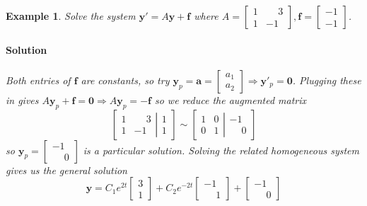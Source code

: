 \documentclass[letterpaper, 11pt, openany]{book}
\theoremstyle{mytheoremstyle}
\theoremstyle{myexamplestyle}
\newtheorem{example}{Example}[section]
\newenvironment{solution}{\paragraph{\sffamily \smaller \fontseries{b}\selectfont Solution}}{\hfill\faSquare}
\begin{document}
\begin{example}
    Solve the system \(\mathbf{y}' =A\mathbf{y} + \mathbf{f}\) where \(A = \begin{bmatrix}
        1 &  \phantom{-}3\\ 1 & -1
    \end{bmatrix},\mathbf{f} = \begin{bmatrix}-1 \\ -1\end{bmatrix}\).
    \begin{solution}
        Both entries of \(\mathbf{f}\) are constants, so try \(\mathbf{y}_{p} = \mathbf{a} = \begin{bmatrix}a_{1} \\ a_{2}\end{bmatrix} \Rightarrow \mathbf{y}'_{p} = \mathbf{0}\). Plugging these in gives \(A \mathbf{y}_{p} + \mathbf{f} = \mathbf{0} \Rightarrow A \mathbf{y}_{p} =  - \mathbf{f}\) so we reduce the augmented matrix
        \[\left[
            \begin{matrix}
            1 &  \phantom{-}3 \\ 1 & -1
            \end{matrix}
            \left|
                \begin{matrix}
                    1 \\ 1
                \end{matrix}
            \right.
        \right] \sim 
        \left[
            \begin{matrix}
            1 &  0 \\ 0 & 1
            \end{matrix}
            \left|
                \begin{matrix}
                    -1 \\  \phantom{-}0
                \end{matrix}
            \right.
        \right]\]
        so \(\mathbf{y}_{p} = \begin{bmatrix}-1 \\  \phantom{-}0\end{bmatrix}\) is a particular solution. Solving the related homogeneous system gives us the general solution
        \[\mathbf{y} = C_{1}e^{2t} \begin{bmatrix}3 \\ 1\end{bmatrix} + C_{2}e^{-2t}\begin{bmatrix}-1 \\  \phantom{-}1\end{bmatrix} + \begin{bmatrix}-1 \\  \phantom{-}0\end{bmatrix}\]
    \end{solution}
\end{example}
\end{document}
